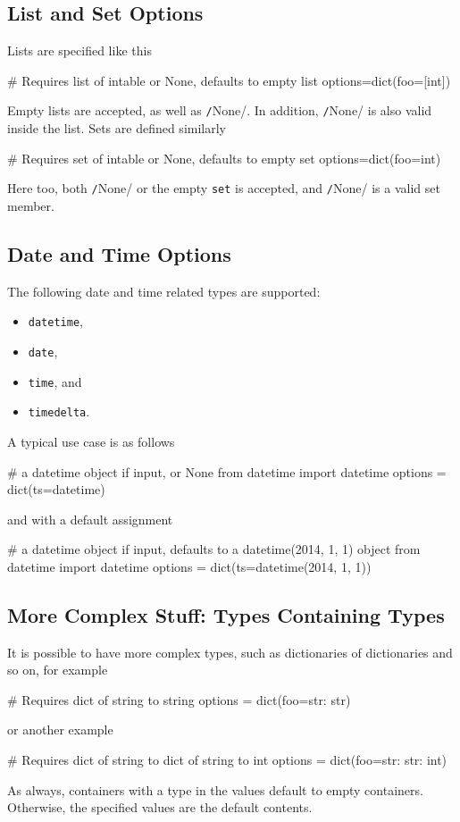 \subsection{List and Set Options}
Lists are specified like this
\begin{python}
# Requires list of intable or None, defaults to empty list
options=dict(foo=[int])
\end{python}
Empty lists are accepted, as well as \texttt/None/.  In
addition, \texttt/None/ is also valid inside the list.
Sets are defined similarly
\begin{python}
# Requires set of intable or None, defaults to empty set
options=dict(foo={int})
\end{python}
Here too, both \texttt/None/ or the empty \texttt{set} is
accepted, and \texttt/None/ is a valid set member.



\subsection{Date and Time Options}
The following date and time related types are supported:
\begin{itemize}
\item[] \texttt{datetime},
\item[] \texttt{date},
\item[] \texttt{time}, and
\item[] \texttt{timedelta}.
\end{itemize}
A typical use case is as follows
\begin{python}
# a datetime object if input, or None
from datetime import datetime
options = dict(ts=datetime)
\end{python}
and with a default assignment
\begin{python}
#  a datetime object if input, defaults to a datetime(2014, 1, 1) object
from datetime import datetime
options = dict(ts=datetime(2014, 1, 1))
\end{python}



\subsection{More Complex Stuff:  Types Containing Types}
It is possible to have more complex types, such as dictionaries of
dictionaries and so on, for example
\begin{python}
# Requires dict of string to string
options = dict(foo={str: str})
\end{python}
or another example
\begin{python}
# Requires dict of string to dict of string to int
options = dict(foo={str: {str: int}})
\end{python}
As always, containers with a type in the values default to empty
containers.  Otherwise, the specified values are the default contents.






